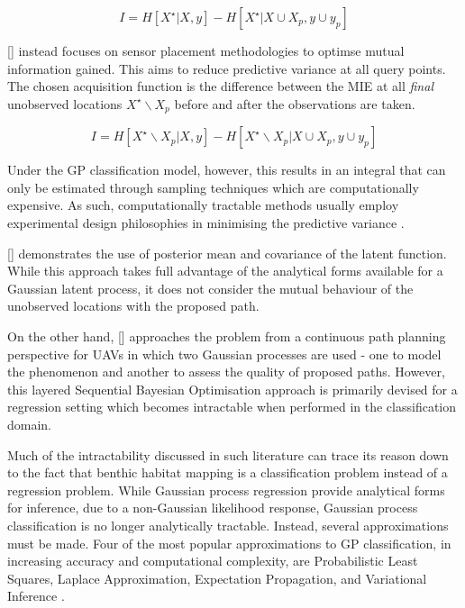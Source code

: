 \documentclass{article}
\newcommand{\incite}[1]{\citeauthor{#1} [\citeyear{#1}]}
\begin{document}
	\begin{equation}
		I = H[X^{\star} | X, y] - H[X^{\star} | X \cup X_{p}, y \cup y_{p}]
	\label{Equation:AsherBenderMutualInformationCriterion}
	\end{equation}
	
	\incite{Krause:2008:NSP:1390681.1390689} instead focuses on sensor placement methodologies to optimse mutual information gained. This aims to reduce predictive variance at all query points. The chosen acquisition function is the difference between the MIE at all \textit{final} unobserved locations $X^{\star} \backslash X_{p}$ before and after the observations are taken.
	
	\begin{equation}
		I = H[X^{\star} \backslash X_{p} | X, y] - H[X^{\star} \backslash X_{p} | X \cup X_{p}, y \cup y_{p}]
	\label{Equation:KrauseAcquisitionCriterion}
	\end{equation}
	
	Under the GP classification model, however, this results in an integral that can only be estimated through sampling techniques which are computationally expensive. As such, computationally tractable methods usually employ experimental design philosophies in minimising the predictive variance \cite{AsherBender}.
	
	\incite{Kapoor} demonstrates the use of posterior mean and covariance of the latent function. While this approach takes full advantage of the analytical forms available for a Gaussian latent process, it does not consider the mutual behaviour of the unobserved locations with the proposed path.
	
	On the other hand, \incite{Roman:SequentialBayesianOptimisation} approaches the problem from a continuous path planning perspective for UAVs in which two Gaussian processes are used - one to model the phenomenon and another to assess the quality of proposed paths. However, this layered Sequential Bayesian Optimisation approach is primarily devised for a regression setting which becomes intractable when performed in the classification domain.
	
	Much of the intractability discussed in such literature can trace its reason down to the fact that benthic habitat mapping is a classification problem instead of a regression problem. While Gaussian process regression provide analytical forms for inference, due to a non-Gaussian likelihood response, Gaussian process classification is no longer analytically tractable. Instead, several approximations must be made. Four of the most popular approximations to GP classification, in increasing accuracy and computational complexity, are Probabilistic Least Squares, Laplace Approximation, Expectation Propagation, and Variational Inference \cite{GaussianProcessForMachineLearning}.
	
\end{document}
